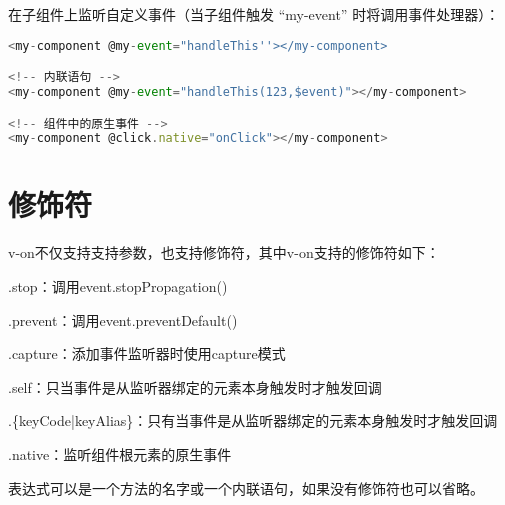 在子组件上监听自定义事件（当子组件触发 “my-event” 时将调用事件处理器）：

\begin{lstlisting}[language=JavaScript]
<my-component @my-event="handleThis''></my-component>

<!-- 内联语句 -->
<my-component @my-event="handleThis(123,$event)"></my-component>

<!-- 组件中的原生事件 -->
<my-component @click.native="onClick"></my-component>
\end{lstlisting}


\section{修饰符}


v-on不仅支持支持参数，也支持修饰符，其中v-on支持的修饰符如下：


\begin{compactitem}
\item .stop：调用event.stopPropagation()
\item .prevent：调用event.preventDefault()
\item .capture：添加事件监听器时使用capture模式
\item .self：只当事件是从监听器绑定的元素本身触发时才触发回调
\item .\{keyCode|keyAlias\}：只有当事件是从监听器绑定的元素本身触发时才触发回调
\item .native：监听组件根元素的原生事件
\end{compactitem}

表达式可以是一个方法的名字或一个内联语句，如果没有修饰符也可以省略。






\begin{lstlisting}[language=JavaScript]

\end{lstlisting}




\begin{lstlisting}[language=JavaScript]

\end{lstlisting}




\begin{lstlisting}[language=JavaScript]

\end{lstlisting}




